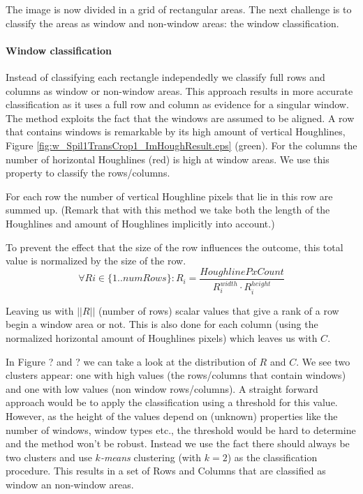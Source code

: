 The image is now divided in a grid of rectangular areas. The next challenge is to 
classify the areas as window and non-window areas: the window classification.

\paragraph{Window classification}
Instead of classifying each rectangle independedly we classify full rows and
columns as window or non-window areas.  This approach results in more accurate
classification as it uses a full row and column as evidence for a singular
window. The method exploits the fact that the windows are assumed to be
aligned.
A row that contains windows is remarkable by its high amount of vertical
Houghlines, Figure \ref{fig:w_Spil1TransCrop1_ImHoughResult.eps}
(green). For the columns the number of horizontal Houghlines
 (red) is high at window areas.  We use this property to classify 
 the rows/columns. 

For each row the number of vertical Houghline pixels that lie in this row are summed up.
(Remark that with this method we take both the length of the Houghlines and amount of Houghlines 
implicitly into account.)

To prevent the effect that the size of the row influences the outcome, this total value
is normalized by the size of the row.
\[\forall Ri\in \{1..numRows\} : R_i = \frac{HoughlinePxCount}{R_i^{width} \cdot R_i^{height}}\]

Leaving us with $||R||$ (number of rows) scalar values that give a rank of a row begin a window area or not.
This is also done for each column (using the normalized horizontal amount of
Houghlines pixels) which leaves us with $C$.

In Figure ? and ? %
we can take a look at the distribution of $R$ and $C$. We see two clusters appear: one with
high values (the rows/columns that contain windows) and one with low values (non window
rows/columns).  A straight forward approach would be to apply the classification using a
threshold for this value.  However, as the height of the values depend on
(unknown) properties like the number of windows, window types etc., the threshold
would be hard to determine and the method won't be robust. Instead we use the fact 
there should always be two clusters and use \emph{$k$-means}
clustering (with $k=2$) as the classification procedure.
This results in a set of Rows and Columns that are classified as window an
non-window areas.

